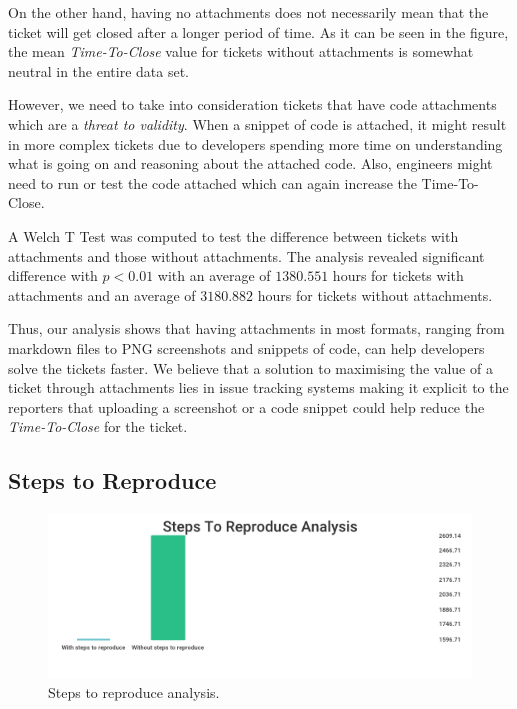 \documentclass{mpaper}
\begin{document}
On the other hand, having no attachments does not necessarily mean that the ticket will get closed after 
a longer period of time. As it can be seen in the figure, the mean \emph{Time-To-Close} value for tickets without 
attachments is somewhat neutral in the entire data set.

However, we need to take into consideration tickets that have code attachments which are a \emph{threat to validity}. 
When a snippet of code is attached, it might result in more complex tickets due to developers spending more time on 
understanding what is going on and reasoning about the attached code. Also, engineers might need to run or test 
the code attached which can again increase the Time-To-Close.

A Welch T Test was computed to test the difference between tickets with attachments and those 
without attachments. The analysis revealed significant difference with $p < 0.01$ with an
average of $1380.551$ hours for tickets with attachments and an average of $3180.882$ hours
for tickets without attachments. 

Thus, our analysis shows that having attachments in most formats, ranging from markdown files to PNG screenshots 
and snippets of code, can help developers solve the tickets faster. We believe that a solution to maximising the value 
of a ticket through attachments lies in issue tracking systems making it explicit to the reporters that uploading a screenshot 
or a code snippet could help reduce the \emph{Time-To-Close} for the ticket.

\vskip18pt

\subsection{Steps to Reproduce}

\begin{figure}[ht]
  \begin{center}
    \includegraphics[scale=0.25]{images/steps_to_reproduce.png}
  \end{center}
  \caption{\label{steps}Steps to reproduce analysis.}
\end{figure}
\end{document}
